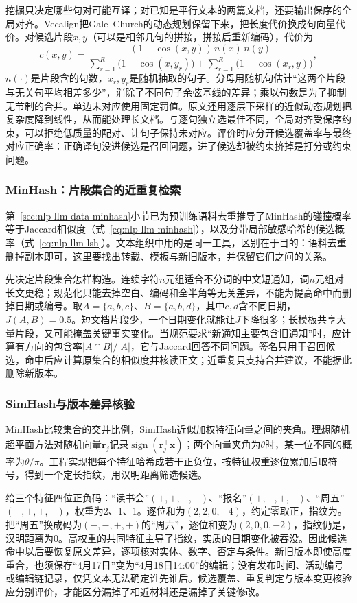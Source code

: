 挖掘只决定哪些句对可能互译；对已知是平行文本的两篇文档，还要输出保序的全局对齐。Vecalign把Gale--Church的动态规划保留下来，把长度代价换成句向量代价。对候选片段$x,y$（可以是相邻几句的拼接，拼接后重新编码），代价为
\[
  c(x,y)=\frac{(1-\cos(x,y))\,n(x)\,n(y)}
  {\sum_{r=1}^{R}\bigl(1-\cos(x,y_r)\bigr)+\sum_{r=1}^{R}\bigl(1-\cos(x_r,y)\bigr)},
\]
$n(\cdot)$是片段含的句数，$x_r,y_r$是随机抽取的句子。分母用随机句估计“这两个片段与无关句平均相差多少”，消除了不同句子余弦基线的差异；乘以句数是为了抑制无节制的合并。单边未对应使用固定罚值。原文还用逐层下采样的近似动态规划把复杂度降到线性，从而能处理长文档。与逐句独立选最佳不同，全局对齐受保序约束，可以拒绝低质量的配对、让句子保持未对应。评价时应分开候选覆盖率与最终对应正确率：正确译句没进候选是召回问题，进了候选却被约束挤掉是打分或约束问题。

\subsubsection{MinHash：片段集合的近重复检索}
\label{sec:nlp-classification-minhash}

第~\ref{sec:nlp-llm-data-minhash}小节已为预训练语料去重推导了MinHash的碰撞概率等于Jaccard相似度（式~\eqref{eq:nlp-llm-minhash}），以及分带局部敏感哈希的候选概率（式~\eqref{eq:nlp-llm-lsh}）。文本组织中用的是同一工具，区别在于目的：语料去重删掉副本即可，这里要找出转载、模板与新旧版本，并保留它们之间的关系。

先决定片段集合怎样构造。连续字符$n$元组适合不分词的中文短通知，词$n$元组对长文更稳；规范化只能去掉空白、编码和全半角等无关差异，不能为提高命中而删掉日期或编号。取$A=\{a,b,c\}$、$B=\{a,b,d\}$，其中$c,d$含不同日期，$J(A,B)=0.5$。短文档片段少，一个日期变化就能让$J$下降很多；长模板共享大量片段，又可能掩盖关键事实变化。当规范要求“新通知主要包含旧通知”时，应计算有方向的包含率$|A\cap B|/|A|$，它与Jaccard回答不同问题。签名只用于召回候选，命中后应计算原集合的相似度并核读正文；近重复只支持合并建议，不能据此删除新版本。

\subsubsection{SimHash与版本差异核验}
\label{sec:nlp-classification-simhash}

MinHash比较集合的交并比例，SimHash近似加权特征向量之间的夹角。理想随机超平面方法对随机向量$\bm r_j$记录$\operatorname{sign}(\bm r_j^\top\bm x)$；两个向量夹角为$\theta$时，某一位不同的概率为$\theta/\pi$。工程实现把每个特征哈希成若干正负位，按特征权重逐位累加后取符号，得到一个定长指纹，用汉明距离筛选候选。

给三个特征四位正负码：“读书会”$(+,+,-,-)$、“报名”$(+,-,+,-)$、“周五”$(-,+,+,-)$，权重为2、1、1。逐位和为$(2,2,0,-4)$，约定零取正，指纹为。把“周五”换成码为$(-,-,+,+)$的“周六”，逐位和变为$(2,0,0,-2)$，指纹仍是，汉明距离为0。高权重的共同特征主导了指纹，实质的日期变化被吞没。因此候选命中以后要恢复原文差异，逐项核对实体、数字、否定与条件。新旧版本即使高度重合，也须保存“4月17日”变为“4月18日14:00”的编辑；没有发布时间、活动编号或编辑链记录，仅凭文本无法确定谁先谁后。候选覆盖、重复判定与版本变更核验应分别评价，才能区分漏掉了相近材料还是漏掉了关键修改。
